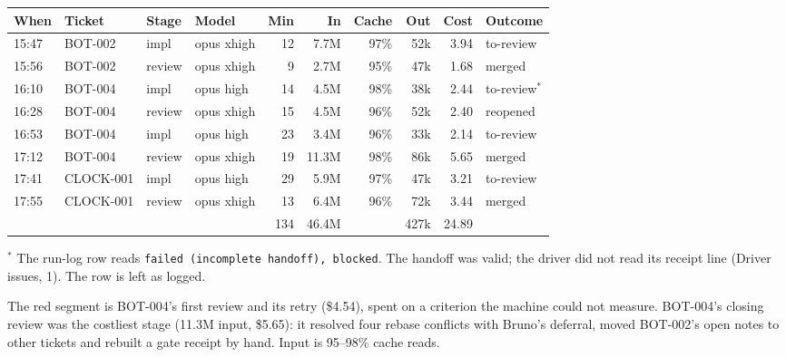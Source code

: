 \documentclass[11pt,a4paper]{article}
\begin{document}
{\small
\begin{tabularx}{\linewidth}{@{}llllrrrrrX@{}}
\toprule
When & Ticket & Stage & Model & Min & In & Cache & Out & Cost & Outcome \\
\midrule
15:47 & BOT-002 & impl & opus xhigh & 12 & 7.7M & 97\% & 52k & 3.94 & to-review \\
15:56 & BOT-002 & review & opus xhigh & 9 & 2.7M & 95\% & 47k & 1.68 & merged \\
16:10 & BOT-004 & impl & opus high & 14 & 4.5M & 98\% & 38k & 2.44 & to-review$^{*}$ \\
16:28 & BOT-004 & review & opus xhigh & 15 & 4.5M & 96\% & 52k & 2.40 & reopened \\
16:53 & BOT-004 & impl & opus high & 23 & 3.4M & 96\% & 33k & 2.14 & to-review \\
17:12 & BOT-004 & review & opus xhigh & 19 & 11.3M & 98\% & 86k & 5.65 & merged \\
17:41 & CLOCK-001 & impl & opus high & 29 & 5.9M & 97\% & 47k & 3.21 & to-review \\
17:55 & CLOCK-001 & review & opus xhigh & 13 & 6.4M & 96\% & 72k & 3.44 & merged \\
\midrule
 & & & & 134 & 46.4M & & 427k & 24.89 & \\
\bottomrule
\end{tabularx}
}

\smallskip
{\small $^{*}$ The run-log row reads \texttt{failed (incomplete handoff), blocked}. The handoff
was valid; the driver did not read its receipt line (Driver issues, 1). The row is left as
logged.}

\begin{center}
\end{center}

The red segment is BOT-004's first review and its retry (\$4.54), spent on a criterion the
machine could not measure. BOT-004's closing review was the costliest stage (11.3M input,
\$5.65): it resolved four rebase conflicts with Bruno's deferral, moved BOT-002's open notes to
other tickets and rebuilt a gate receipt by hand. Input is 95--98\% cache reads.
\end{document}
